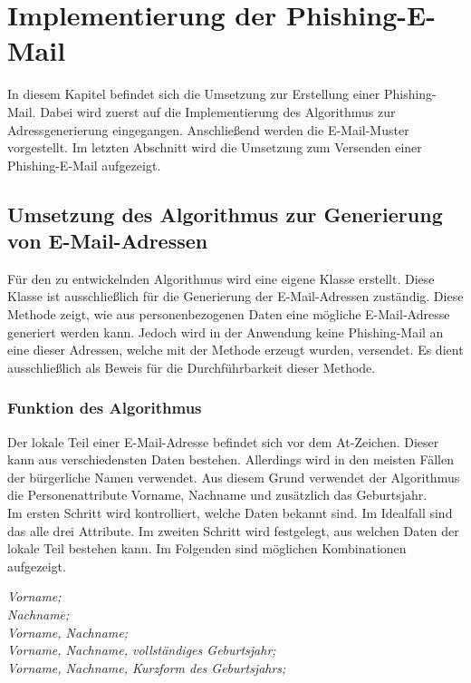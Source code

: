 
\chapter{Implementierung der Phishing-E-Mail}  %
\label{cha:ErstellungeinerPhishing-Mail} %
In diesem Kapitel befindet sich die Umsetzung zur Erstellung einer Phishing-Mail. Dabei wird zuerst auf die Implementierung des Algorithmus zur Adressgenerierung eingegangen. Anschließend werden die E-Mail-Muster vorgestellt. Im letzten Abschnitt wird die Umsetzung zum Versenden einer Phishing-E-Mail aufgezeigt. 

\section{Umsetzung des Algorithmus zur Generierung von E-Mail-Adressen}	
Für den zu entwickelnden Algorithmus wird eine eigene Klasse erstellt. Diese Klasse ist ausschließlich für die Generierung der E-Mail-Adressen zuständig. Diese Methode zeigt, wie aus personenbezogenen Daten eine mögliche E-Mail-Adresse generiert werden kann. Jedoch wird in der Anwendung keine Phishing-Mail an eine dieser Adressen, welche mit der Methode erzeugt wurden, versendet. Es dient ausschließlich als Beweis für die Durchführbarkeit dieser Methode.

	\subsection{Funktion des Algorithmus}
	Der lokale Teil einer E-Mail-Adresse befindet sich vor dem At-Zeichen. Dieser kann aus verschiedensten Daten bestehen. Allerdings wird in den meisten Fällen der bürgerliche Namen verwendet. \cite{NameAlsEMail} Aus diesem Grund verwendet der Algorithmus die Personenattribute Vorname, Nachname und zusätzlich das Geburtsjahr.\\
	Im ersten Schritt wird kontrolliert, welche Daten bekannt sind. Im Idealfall sind das alle drei Attribute. Im zweiten Schritt wird festgelegt, aus welchen Daten der lokale Teil bestehen kann. Im Folgenden sind möglichen Kombinationen aufgezeigt.
	
	\textit{Vorname;}\\
	\textit{Nachname;}\\
	\textit{Vorname, Nachname;}\\
	\textit{Vorname, Nachname, vollständiges Geburtsjahr;}\\
	\textit{Vorname, Nachname, Kurzform des Geburtsjahrs;}
	
